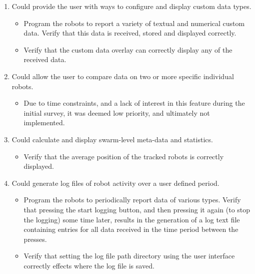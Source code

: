 \begin{enumerate}[label=S\arabic*.]
 \item Could provide the user with ways to configure and display custom data types.
 \begin{itemize}
  \item Program the robots to report a variety of textual and numerical custom data. Verify that this data is received, stored and displayed correctly.
  \item Verify that the custom data overlay can correctly display any of the received data.
 \end{itemize}
 
 \item Could allow the user to compare data on two or more specific individual robots.
 \begin{itemize}
  \item Due to time constraints, and a lack of interest in this feature during the initial survey, it was deemed low priority, and ultimately not implemented.
 \end{itemize}
 
 \item Could calculate and display swarm-level meta-data and statistics.
 \begin{itemize}
  \item Verify that the average position of the tracked robots is correctly displayed.
 \end{itemize}
 
 \item Could generate log files of robot activity over a user defined period.
 \begin{itemize}
  \item Program the robots to periodically report data of various types. Verify that pressing the start logging button, and then pressing it again (to stop the logging) some time later, results in the generation of a log text file containing entries for all data received in the time period between the presses.
  \item Verify that setting the log file path directory using the user interface correctly effects where the log file is saved.
 \end{itemize}
\end{enumerate}

